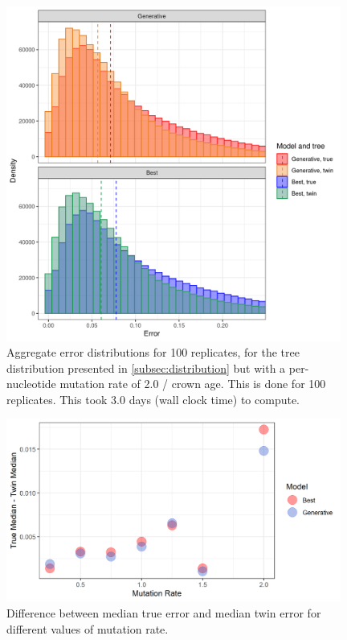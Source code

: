 \begin{figure}[H]
  \includegraphics[width=0.98\textwidth]{pirouette_example_40/errors.png}
  \caption{Aggregate error distributions for 100 replicates,
    for the tree distribution presented 
    in \ref{subsec:distribution} but with a per-nucleotide mutation rate 
    of 2.0 / crown age. 
    This is done for 100 replicates.
    This took 3.0 days (wall clock time) to compute.}
  \label{fig:example_2.00_mutation_rate}
\end{figure}

\begin{figure}[H]
  \includegraphics[width=0.98\textwidth]{supplementary_figures/plot_error_vs_mutation_rate.png}
  \caption{Difference between median true error and median twin error for different values of mutation rate.}
  \label{fig:error_vs_mutationrate}
\end{figure}

